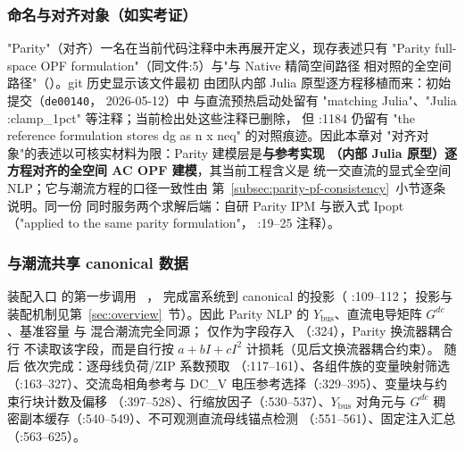 \subsubsection*{命名与对齐对象（如实考证）}
"Parity"（对齐）一名在当前代码注释中未再展开定义，现存表述只有
"Parity full-space OPF formulation"（同文件:5）与"与 Native 精简空间路径
相对照的全空间路径"（）。git 历史显示该文件最初
由团队内部 Julia 原型逐方程移植而来：初始提交（\texttt{de00140}，
2026-05-12）中  与直流预热启动处留有
"matching Julia"、"Julia :clamp\_1pct" 等注释；当前检出处这些注释已删除，
但 :1184 仍留有
"the reference formulation stores dg as n x neq" 的对照痕迹。因此本章对
"对齐对象"的表述以可核实材料为限：Parity 建模层是\textbf{与参考实现
（内部 Julia 原型）逐方程对齐的全空间 AC OPF 建模}，其当前工程含义是
统一交直流的显式全空间 NLP；它与潮流方程的口径一致性由
第~\ref{subsec:parity-pf-consistency}~小节逐条说明。同一份
 同时服务两个求解后端：自研 Parity IPM 与嵌入式
Ipopt（"applied to the same parity formulation"，
:19--25
注释）。

\subsubsection*{与潮流共享 canonical 数据}
\begin{sloppypar}
装配入口  的第一步调用
\allowbreak\ ，
完成富系统到 canonical  的投影（
:109--112；
投影与装配机制见第~\ref{sec:overview}~节）。因此 Parity NLP 的
$Y_{\mathrm{bus}}$、直流电导矩阵 $G^{dc}$、基准容量  与
混合潮流完全同源； 仅作为字段存入 
（:324），Parity 换流器耦合行
不读取该字段，而是自行按 $a+bI+cI^2$ 计损耗（见后文换流器耦合约束）。
随后  依次完成：逐母线负荷/ZIP 系数预取
（:117--161）、各组件族的变量映射筛选（:163--327）、交流岛相角参考与
DC\_V 电压参考选择（:329--395）、变量块与约束行块计数及偏移
（:397--528）、行缩放因子（:530--537）、$Y_{\mathrm{bus}}$ 对角元与
$G^{dc}$ 稠密副本缓存（:540--549）、不可观测直流母线锚点检测
（:551--561）、固定注入汇总（:563--625）。
\end{sloppypar}

